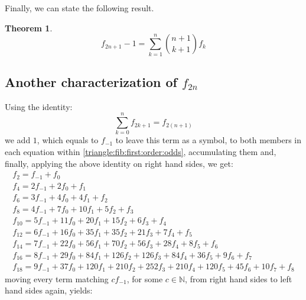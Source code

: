 \documentclass[a4paper,dottedtoc,headinclude,footinclude]{report} %
\theoremstyle{plain}
\newtheorem{thm}{Theorem}[section]
\begin{document}
    Finally, we can state the following result.
    \begin{thm}
        \begin{displaymath}
            f_{2n+1} - 1 = \sum_{k=1}^{n}{{{n+1}\choose{k+1}}f_{k}}
        \end{displaymath}
    \end{thm}
    
    \subsection{Another characterization of $f_{2n}$}
    Using the identity:
    \begin{displaymath}
        \sum_{k=0}^{n} f_{2 k + 1} = f_{2 (n+1)}
    \end{displaymath}
    we add $1$, which equals to $f_{-1}$ to leave this term
    as a symbol, to both members in each equation within 
    \autoref{triangle:fib:first:order:odds}, accumulating them
    and, finally, applying the above identity on right hand sides, we get:
    \begin{displaymath}
        \begin{array}{c}
            f_{2} = f_{-1} + f_{0}\\
            f_{4} =2 f_{-1} + 2 f_{0} + f_{1}\\
            f_{6} =3 f_{-1} + 4 f_{0} + 4 f_{1} + f_{2}\\
            f_{8} =4 f_{-1} + 7 f_{0} + 10 f_{1} + 5 f_{2} + f_{3}\\
            f_{10} =5 f_{-1} + 11 f_{0} + 20 f_{1} + 15 f_{2} + 6 f_{3} + f_{4}\\
            f_{12} =6 f_{-1} + 16 f_{0} + 35 f_{1} + 35 f_{2} + 21 f_{3} + 7 f_{4} + f_{5}\\
            f_{14} =7 f_{-1} + 22 f_{0} + 56 f_{1} + 70 f_{2} + 56 f_{3} + 28 f_{4} + 8 f_{5} + f_{6}\\
            f_{16} =8 f_{-1} + 29 f_{0} + 84 f_{1} + 126 f_{2} + 126 f_{3} + 84 f_{4} + 36 f_{5} + 9 f_{6} + f_{7}\\
            f_{18} =9 f_{-1} + 37 f_{0} + 120 f_{1} + 210 f_{2} + 252 f_{3} + 210 f_{4} + 120 f_{5} + 45 f_{6} + 10 f_{7} + f_{8}
            \end{array}
    \end{displaymath}
    moving every term matching $c f_{-1}$, for some $c\in\mathbb{N}$, from right hand sides to
    left hand sides again, yields:
\end{document}
